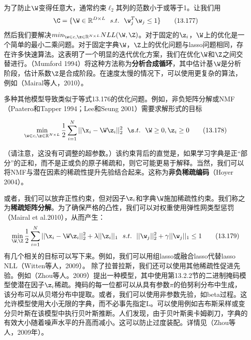 \documentclass[a4paper]{article}
\begin{document}
为了防止$\W$变得任意大，通常约束$\ell_2$其列的范数小于或等于1。让我们用
\begin{equation}
	\C=\{\W\in \mathbb{R}^{D\times L}\ \ s.t.\ \ \w_j^T\w_j\le 1\}\tag{13.177}
\end{equation}
然后我们要解决$min_{\w\in c,\z\in \mathbb{R}^{N\times L}}NLL(\W,\Z)$。对于固定的$\z_i$，$\W$上的优化是一个简单的最小二乘问题。对于固定字典$\W$，$\Z$上的优化问题与lasso问题相同，存在许多快速算法。这表明了一个明显的迭代优化方案，我们在优化$\W$和$\Z$之间交替进行。（Mumford 1994）将这种方法称为\textbf{分析合成循环}，其中估计基$\W$是分析阶段，估计系数$\Z$是合成阶段。在速度太慢的情况下，可以使用更复杂的算法，例如（Mairal等人，2010）。

多种其他模型导致类似于等式13.176的优化问题。例如，非负矩阵分解或NMF（Paatero和Tapper 1994；Lee和Seung 2001）需要求解形式的目标


\begin{equation}
	\min_{\w\in c,\z\in \mathbb{R}^{N\times L}}\frac{1}{2}\sum_{i=1}^{N}||\x_i-\W\z_i||_2^2\ \ \s.t. \ \ \W\ge 0,\z_i\ge 0\tag{13.178}
\end{equation}

（请注意，这没有可调整的超参数。）该约束背后的直觉是，如果学习字典是正“部分”的正和，而不是正或负的原子稀疏和，则它可能更易于解释。当然，我们可以将NMF与潜在因素的稀疏性提升先验结合起来。这称为\textbf{非负稀疏编码}（Hoyer 2004）。

或者，我们可以放弃正性约束，但对因子$\z_i$和字典$\W$施加稀疏性约束。我们称之为\textbf{稀疏矩阵分解}。为了确保严格的凸性，我们可以对权重使用弹性网类型惩罚（Mairal et al.2010），从而产生：
\begin{equation}
	\min_{\W,\Z}\frac{1}{2}\sum_{i=1}^{N}||\x_i-\W\z_i||_2^2+\lambda||\z_i||_1\ \ s.t.\  \ ||\w_j||_2^2+\gamma||\w_j||_1\le 1\tag{13.179}
\end{equation}
有几个相关的目标可以写下来。例如，我们可以用组lasso或融合lasso代替lasso NLL（Witten等人，2009）。
除了拉普拉斯，我们还可以使用其他稀疏性促进先验。例如（Zhou等人。2009）提出一种模型，其中使用第13.2.2节的二进制掩码模型使潜在因子$\z_i$稀疏。掩码的每一位都可以从具有参数$\pi $的伯努利分布中生成，该分布可以从贝塔分布中提取。或者，我们可以使用非参数先验，如beta过程。这允许模型使用大小无限的字典，而不必事先指定L。可以使用例如吉布斯采样或变分贝叶斯在该模型中执行贝叶斯推断。人们发现，由于贝叶斯奥卡姆剃刀，字典的有效大小随着噪声水平的升高而减小。这可以防止过度装配。详情见（Zhou等人，2009年）。
\end{document}
